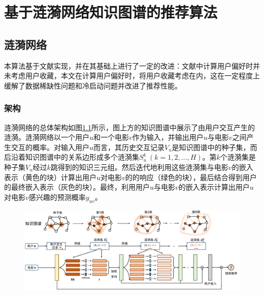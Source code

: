 \documentclass{bjfuthesis}
\begin{document}
\chapter{基于涟漪网络知识图谱的推荐算法}
\label{ch:offline-recommendation}
\section{涟漪网络}
本算法基于文献\parencite{wang2018ripplenet}实现，并在其基础上进行了一定的改进：文献\parencite{wang2018ripplenet}中计算用户偏好时并未考虑用户收藏，本文在计算用户偏好时，将用户收藏考虑在内，这在一定程度上缓解了数据稀缺性问题和冷启动问题并改进了推荐性能。
\subsection{架构}
涟漪网络的总体架构如图\ref{fig:ripplenet-framework}所示，图上方的知识图谱中展示了由用户交互产生的涟漪。涟漪网络以一个用户$u$和一个电影$v$作为输入，并输出用户$u$与电影$v$之间产生交互的概率。对输入用户$u$而言，其历史交互记录$V_u$是知识图谱中的种子集，而后沿着知识图谱中的关系边形成多个涟漪集$S_u^{k}\ (k=1, 2, \dots, H)$。第$k$个涟漪集是种子集$V_u$经过$k$跳得到的知识三元组。然后迭代地利用这些涟漪集与电影$v$的嵌入表示（黄色的块）计算出用户$u$对电影$v$的的响应（绿色的块），最后结合得到用户的最终嵌入表示（灰色的块）。最终，利用用户$u$与电影$v$的嵌入表示计算出用户$u$对电影$v$感兴趣的预测概率$y_{uv}$。
\begin{figure}
	\includegraphics[width=\textwidth]{figures/ripplenet-framework.png}
	\label{fig:ripplenet-framework}
\end{figure}
\end{document}
